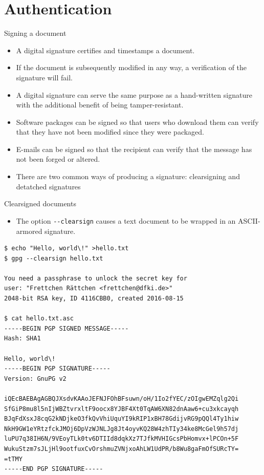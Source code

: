 \documentclass[
mode=present,
paper=smartboard,
size=20pt,
]{powerdot}
\newcommand\vsp{\vspace{-16mm}}
\newcommand{\clopt}[1]{\texttt{{-}#1}}
\begin{document}
\section{Authentication}

\begin{slide}{Signing a document}
  \begin{itemize}
  \item A digital signature certifies and timestamps a document.
  \item If the document is subsequently modified in any way, a
    verification of the signature will fail.
  \item A digital signature can serve the same purpose as a
    hand-written signature with the additional benefit of being
    tamper-resistant.
  \item Software packages can be signed so that users who download
    them can verify that they have not been modified since they were
    packaged.
  \item E-mails can be signed so that the recipient can verify that the
    message has not been forged or altered.
  \item There are two common ways of producing a signature:
    clearsigning and detatched signatures
  \end{itemize}
\end{slide}

\makeatletter\renewcommand{\verbatim@font}{\tiny\tt}\makeatother
\begin{slide}[method=direct]{Clearsigned documents}
  \begin{itemize}
  \item The option \clopt{-clearsign} causes a text document to be
    wrapped in an ASCII-armored signature.
  \end{itemize}
\vsp
\begin{verbatim}
$ echo "Hello, world\!" >hello.txt
$ gpg --clearsign hello.txt

You need a passphrase to unlock the secret key for
user: "Frettchen Rättchen <frettchen@dfki.de>"
2048-bit RSA key, ID 4116CBB0, created 2016-08-15

$ cat hello.txt.asc
-----BEGIN PGP SIGNED MESSAGE-----
Hash: SHA1

Hello, world\!
-----BEGIN PGP SIGNATURE-----
Version: GnuPG v2

iQEcBAEBAgAGBQJXsdvKAAoJEFNJFOhBFsuwn/oH/1Io2fYEC/zOIgwEMZqlg2Qi
SfGiP8mu8l5nIjWBZtvrxltF9oocx8YJBF4Xt0TqAW6XN82dnAaw6+cu3xkcayqh
BJqFdXsxJ8cqG2kNDjkeO3fkQvVhiUquYI9kRIP1xBH78GdijvRG9pQQl4Ty1hiw
NkH9GW1eYRtzfckJMOj6DpVzWJNLJg8Jt4oyvKQ28W4zhTIy34ke8McGel9h57dj
luPU7q38IH6N/9VEoyTLk0tv6DTIId8dqkXz7TJfkMVHIGcsPbHomvx+lPCOn+5F
WukuStzm7sJLjHl9ootfuxCvOrshmuZVNjxoAhLW1UdPR/b8Wu8gaFmOfSURcTY=
=tTMY
-----END PGP SIGNATURE-----
\end{verbatim}
\end{slide}
\end{document}
